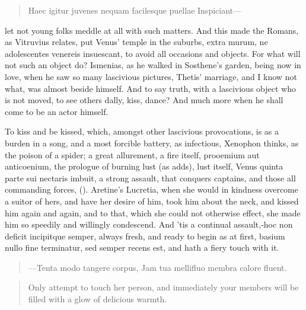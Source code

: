 \begin{latin}
\begin{verse}
Haec igitur juvenes nequam facilesque puellae
Inspiciant---
\end{verse}
\end{latin}

let not young folks meddle at all with such matters. And this made the
Romans, as Vitruvius relates, put Venus' temple in the suburbs,
extra murum, ne adolescentes venereis insuescant, to avoid all
occasions and objects. For what will not such an object do? Ismenias,
as he walked in Sosthene's garden, being now in love, when he saw so
many lascivious pictures, Thetis' marriage, and I know not what,
was almost beside himself. And to say truth, with a lascivious object
who is not moved, to see others dally, kiss, dance? And much more when
he shall come to be an actor himself.

To kiss and be kissed, which, amongst other lascivious provocations, is
as a burden in a song, and a most forcible battery, as infectious,
 Xenophon thinks, as the poison of a spider; a great allurement,
a fire itself, prooemium aut anticoenium, the prologue of burning lust
(as \Apuleius adds), lust itself, Venus quinta parte sui nectaris
imbuit, a strong assault, that conquers captains, and those all
commanding forces, ().
Aretine's Lucretia, when she would in kindness overcome a suitor
of hers, and have her desire of him, took him about the neck, and
kissed him again and again, and to that, which she could not otherwise
effect, she made him so speedily and willingly condescend. And 'tis a
continual assault,-hoc non deficit incipitque semper, always
fresh, and ready to begin as at first, basium nullo fine
terminatur, sed semper recens est, and hath a fiery touch with it.

\begin{latin}
\begin{verse}
---Tenta modo tangere corpus,
Jam tua mellifluo membra calore fluent.
\end{verse}
\end{latin}
\translationrule%
\begin{verse}%
Only attempt to touch her person,
and immediately your members
will be filled with a glow of delicious warmth.
\end{verse}%


